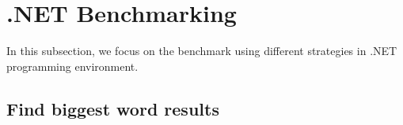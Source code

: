 %
%
%
%
%


\clearpage

\section{.NET Benchmarking}
\label{sec:dotnet_implementation}

In this subsection, we focus on the benchmark using different strategies in .NET programming environment.



\subsection{Find biggest word  results}
\label{subsubsec:biggest_word_results_cs}

